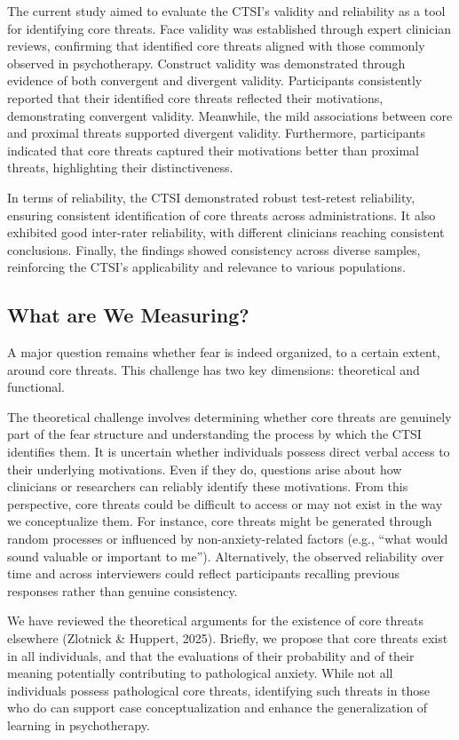 \documentclass[
  man,floatsintext]{apa7}
\begin{document}
The current study aimed to evaluate the CTSI's validity and reliability as a tool for identifying core threats.
Face validity was established through expert clinician reviews, confirming that identified core threats aligned with those commonly observed in psychotherapy.
Construct validity was demonstrated through evidence of both convergent and divergent validity.
Participants consistently reported that their identified core threats reflected their motivations, demonstrating convergent validity.
Meanwhile, the mild associations between core and proximal threats supported divergent validity.
Furthermore, participants indicated that core threats captured their motivations better than proximal threats, highlighting their distinctiveness.

In terms of reliability, the CTSI demonstrated robust test-retest reliability, ensuring consistent identification of core threats across administrations.
It also exhibited good inter-rater reliability, with different clinicians reaching consistent conclusions.
Finally, the findings showed consistency across diverse samples, reinforcing the CTSI's applicability and relevance to various populations.

\subsection{What are We Measuring?}\label{what-are-we-measuring}

A major question remains whether fear is indeed organized, to a certain extent, around core threats.
This challenge has two key dimensions: theoretical and functional.

The theoretical challenge involves determining whether core threats are genuinely part of the fear structure and understanding the process by which the CTSI identifies them.
It is uncertain whether individuals possess direct verbal access to their underlying motivations.
Even if they do, questions arise about how clinicians or researchers can reliably identify these motivations.
From this perspective, core threats could be difficult to access or may not exist in the way we conceptualize them.
For instance, core threats might be generated through random processes or influenced by non-anxiety-related factors (e.g., ``what would sound valuable or important to me'').
Alternatively, the observed reliability over time and across interviewers could reflect participants recalling previous responses rather than genuine consistency.

We have reviewed the theoretical arguments for the existence of core threats elsewhere (Zlotnick \& Huppert, 2025).
Briefly, we propose that core threats exist in all individuals, and that the evaluations of their probability and of their meaning potentially contributing to pathological anxiety.
While not all individuals possess pathological core threats, identifying such threats in those who do can support case conceptualization and enhance the generalization of learning in psychotherapy.
\end{document}
